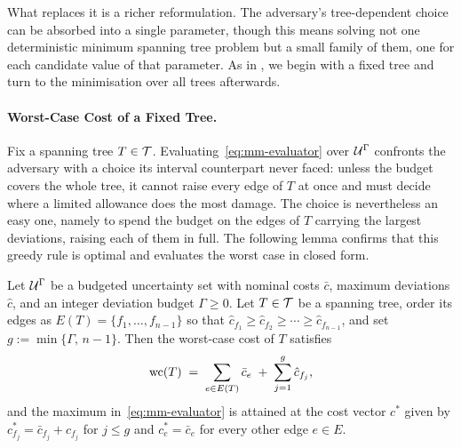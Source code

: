 What replaces it is a richer reformulation.
The adversary's tree-dependent choice can be absorbed into a single parameter, though this means solving not one deterministic minimum spanning tree problem but a small family of them, one for each candidate value of that parameter.
As in , we begin with a fixed tree and turn to the minimisation over all trees afterwards.

\paragraph{Worst-Case Cost of a Fixed Tree.}

Fix a spanning tree $T \in \mathcal{T}$.
Evaluating~\eqref{eq:mm-evaluator} over $\mathcal{U}^{\Gamma}$ confronts the adversary with a choice its interval counterpart never faced: unless the budget covers the whole tree, it cannot raise every edge of $T$ at once and must decide where a limited allowance does the most damage.
The choice is nevertheless an easy one, namely to spend the budget on the edges of $T$ carrying the largest deviations, raising each of them in full.
The following lemma confirms that this greedy rule is optimal and evaluates the worst case in closed form.

\begin{lemma}\label{lem:budgeted-extremal-cost}
Let $\mathcal{U}^{\Gamma}$ be a budgeted uncertainty set with nominal costs $\bar{c}$, maximum deviations $\hat{c}$, and an integer deviation budget $\Gamma \geq 0$.
Let $T \in \mathcal{T}$ be a spanning tree, order its edges as $E(T) = \{f_1, \ldots, f_{n-1}\}$ so that $\hat{c}_{f_1} \geq \hat{c}_{f_2} \geq \cdots \geq \hat{c}_{f_{n-1}}$, and set $g := \min\{\Gamma,\, n-1\}$.
Then the worst-case cost of $T$ satisfies
\[
\mathrm{wc}(T) \;=\; \sum_{e \in E(T)} \bar{c}_e \;+\; \sum_{j=1}^{g} \hat{c}_{f_j},
\]
and the maximum in~\eqref{eq:mm-evaluator} is attained at the cost vector $c^{*}$ given by $c^{*}_{f_j} = \bar{c}_{f_j} + \hat{c}_{f_j}$ for $j \leq g$ and $c^{*}_e = \bar{c}_e$ for every other edge $e \in E$.
\end{lemma}

